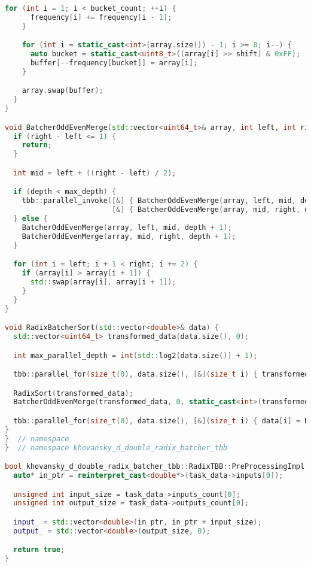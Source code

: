 \documentclass[12pt]{article}
\begin{document}
\begin{lstlisting}[language=C++,
    breaklines=true,       % Автоматический перенос строк
    columns=fullflexible ]
    for (int i = 1; i < bucket_count; ++i) {
      frequency[i] += frequency[i - 1];
    }

    for (int i = static_cast<int>(array.size()) - 1; i >= 0; i--) {
      auto bucket = static_cast<uint8_t>((array[i] >> shift) & 0xFF);
      buffer[--frequency[bucket]] = array[i];
    }

    array.swap(buffer);
  }
}

void BatcherOddEvenMerge(std::vector<uint64_t>& array, int left, int right, int max_depth, int depth = 0) {
  if (right - left <= 1) {
    return;
  }

  int mid = left + ((right - left) / 2);

  if (depth < max_depth) {
    tbb::parallel_invoke([&] { BatcherOddEvenMerge(array, left, mid, depth + 1); },
                         [&] { BatcherOddEvenMerge(array, mid, right, depth + 1); });
  } else {
    BatcherOddEvenMerge(array, left, mid, depth + 1);
    BatcherOddEvenMerge(array, mid, right, depth + 1);
  }

  for (int i = left; i + 1 < right; i += 2) {
    if (array[i] > array[i + 1]) {
      std::swap(array[i], array[i + 1]);
    }
  }
}

void RadixBatcherSort(std::vector<double>& data) {
  std::vector<uint64_t> transformed_data(data.size(), 0);

  int max_parallel_depth = int(std::log2(data.size()) + 1);

  tbb::parallel_for(size_t(0), data.size(), [&](size_t i) { transformed_data[i] = EncodeDoubleToUint64(data[i]); });

  RadixSort(transformed_data);
  BatcherOddEvenMerge(transformed_data, 0, static_cast<int>(transformed_data.size()), max_parallel_depth);

  tbb::parallel_for(size_t(0), data.size(), [&](size_t i) { data[i] = DecodeUint64ToDouble(transformed_data[i]); });
}
}  // namespace
}  // namespace khovansky_d_double_radix_batcher_tbb

bool khovansky_d_double_radix_batcher_tbb::RadixTBB::PreProcessingImpl() {
  auto* in_ptr = reinterpret_cast<double*>(task_data->inputs[0]);

  unsigned int input_size = task_data->inputs_count[0];
  unsigned int output_size = task_data->outputs_count[0];

  input_ = std::vector<double>(in_ptr, in_ptr + input_size);
  output_ = std::vector<double>(output_size, 0);

  return true;
}


\end{lstlisting}
\end{document}
